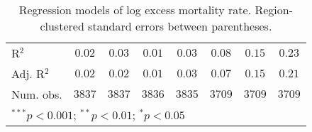 \begin{table}
\begin{center}
\begin{tabular}{l c c c c c c c}
\hline
R$^2$          & $0.02$       & $0.03$       & $0.01$       & $0.03$       & $0.08$        & $0.15$        & $0.23$        \\
Adj. R$^2$     & $0.02$       & $0.02$       & $0.01$       & $0.03$       & $0.07$        & $0.15$        & $0.21$        \\
Num. obs.      & $3837$       & $3837$       & $3836$       & $3835$       & $3709$        & $3709$        & $3709$        \\
\hline
\multicolumn{8}{l}{\scriptsize{$^{***}p<0.001$; $^{**}p<0.01$; $^{*}p<0.05$}}
\end{tabular}
\caption{Regression models of log excess mortality rate. Region-clustered standard errors between parentheses.}
\label{tab:basemodels}
\end{center}
\end{table}
